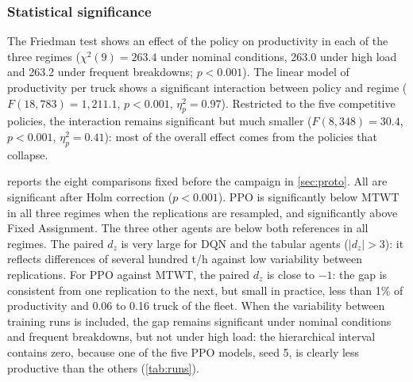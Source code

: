 \documentclass[11pt,a4paper]{article}
\newif\ifrevmarks
\newcommand{\revtag}[1]{\ifrevmarks\textsuperscript{\textcolor{red!70!black}{\scriptsize[#1]}}\fi}
\newenvironment{revbloc}[1]{\par\ifrevmarks\color{revcolor}\noindent\revtag{#1}\ \fi}{\par}
\newif\ifcorrmarks
\newcommand{\corr}[1]{\ifcorrmarks\textcolor{corrcolor}{#1}\else#1\fi}
\begin{document}
\subsubsection{Statistical significance}
\label{sec:stats}

\begin{revbloc}{T31}
The Friedman test shows an effect of the policy on productivity in each of the three regimes ($\chi^2(9) = 263.4$ under nominal conditions, 263.0 under high load and 263.2 under frequent breakdowns; $p<0.001$). The linear model of productivity per truck shows a significant interaction between policy and regime ($F(18, 783) = 1{,}211.1$, $p<0.001$, $\eta^2_p = 0.97$). \corr{Restricted to the five competitive policies, the interaction remains significant but much smaller ($F(8, 348) = 30.4$, $p<0.001$, $\eta^2_p = 0.41$): most of the overall effect comes from the policies that collapse.}

 reports the eight comparisons fixed before the campaign in \cref{sec:proto}. All are significant after Holm correction ($p<0.001$). PPO is significantly below MTWT in all three regimes \corr{when the replications are resampled}, and significantly above Fixed Assignment. The three other agents are below both references in all regimes. \corr{The paired $d_z$ is very large for DQN and the tabular agents ($|d_z| > 3$)}: it reflects differences of several hundred t/h against low variability between replications. \corr{For PPO against MTWT, the paired $d_z$ is close to $-1$: the gap is consistent from one replication to the next, but small in practice, less than 1\% of productivity and 0.06 to 0.16 truck of the fleet. When the variability between training runs is included, the gap remains significant under nominal conditions and frequent breakdowns, but not under high load: the hierarchical interval contains zero, because one of the five PPO models, seed 5, is clearly less productive than the others (\cref{tab:runs}).}


\end{revbloc}
\end{document}
